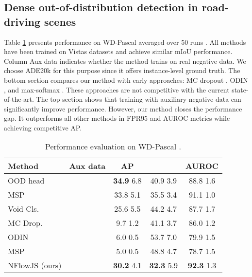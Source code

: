 \documentclass[lettersize,journal,hidelinks]{IEEEtran}
\newcommand{\cmark}{\ding{51}}
\newcommand{\xmark}{\ding{55}}
\begin{document}
\subsection{Dense out-of-distribution detection in road-driving scenes}
\label{sec:exp_ood_rd}


Table \ref{tbl:wd-pascal} presents performance on WD-Pascal averaged over 50 runs \cite{bevandic19gcpr}.
All methods have been trained on Vistas datasets and achieve similar mIoU performance.
Column Aux data indicates whether 
the method trains on real negative data.
We choose ADE20k for this purpose since it offers instance-level ground truth.
The bottom section compares our method
with early approaches:
MC dropout \cite{kendall17nips},
ODIN \cite{liang18iclr},
and max-softmax \cite{hendrycks17iclr}.
These approaches are not competitive with the current state-of-the-art.
The top section shows that training with auxiliary negative data
can significantly improve performance.
However, our method closes the performance gap.
It outperforms all other methods in FPR95 and AUROC metrics
while achieving competitive AP.
\begin{table}[ht]
\centering
\caption{
Performance evaluation on WD-Pascal \cite{bevandic19gcpr}.
}
\label{tbl:wd-pascal}
\begin{footnotesize}
\begin{tabular}{l|cccc}
\hline \hline
Method & Aux data & AP            &         & AUROC        \\ \hline
OOD head \cite{bevandic19gcpr} &  \cmark  &  \textbf{34.9}  6.8 & 40.9  3.9  & 88.8   1.6  \\
MSP \cite{bevandic19gcpr} &  \cmark  &  33.8  5.1  & 35.5  3.4 &  91.1  1.0  \\
Void Cls. \cite{blum21ijcv} &  \cmark  &  25.6  5.5  &  44.2  4.7 &  87.7  1.7  \\\hdashline
MC Drop. \cite{kendall17nips} & \xmark   &  9.7  1.2  & 41.1  3.7  &   86.0  1.2\\
ODIN \cite{liang18iclr} & \xmark   & 6.0  0.5   & 53.7  7.0  &  79.9  1.5  \\
MSP \cite{hendrycks17iclr} &  \xmark  & 5.0  0.5  & 48.8  4.7  & 78.7  1.5   \\
NFlowJS (ours) & \xmark   &  \textbf{30.2}  4.1  &  \textbf{32.3}  5.9 &  \textbf{92.3}  1.3 \\\hline
\end{tabular}
\end{footnotesize}
\end{table}
\end{document}
